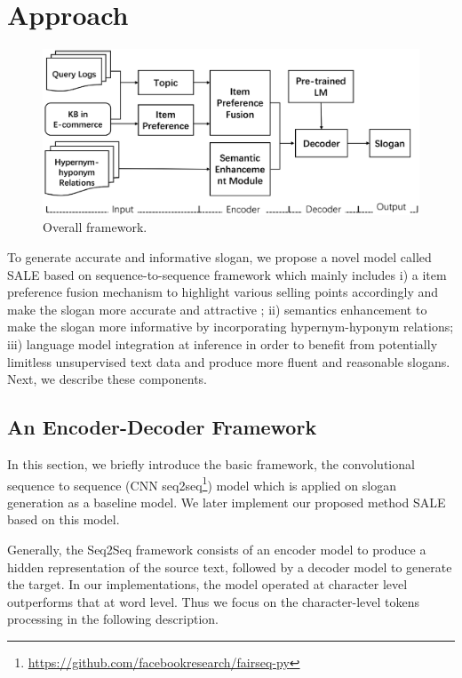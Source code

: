 \section{Approach}
\label{sec:approach}

\begin{figure}[th!]
	\centering
	\includegraphics[width=1.6\columnwidth]{figures/flow}
	\caption{Overall framework.}
	\label{fig:flow}
\end{figure}

To generate accurate and informative slogan,
we propose a novel model called SALE based on 
sequence-to-sequence framework which mainly includes 
i) a item preference fusion mechanism to highlight various selling points accordingly
and make the slogan more accurate and attractive ;
ii) semantics enhancement to make the slogan more informative by incorporating hypernym-hyponym relations;
iii) language model integration at inference in order to benefit 
from potentially limitless unsupervised text data and produce more fluent and reasonable slogans.
Next, we describe these components.



\subsection{An Encoder-Decoder Framework}
\label{sec:baseline}
In this section, we briefly introduce the basic framework, the convolutional sequence to sequence (CNN seq2seq\footnote{\url{https://github.com/facebookresearch/fairseq-py}}) model which is applied on slogan generation as a baseline model.
We later implement our proposed method SALE based on this model.

Generally, the Seq2Seq framework consists of an encoder model to produce
a hidden representation of the source text, followed by a decoder model
to generate the target.
In our implementations, the model operated at character level outperforms that at word level. 
Thus we focus on the character-level tokens
processing in the following description.

